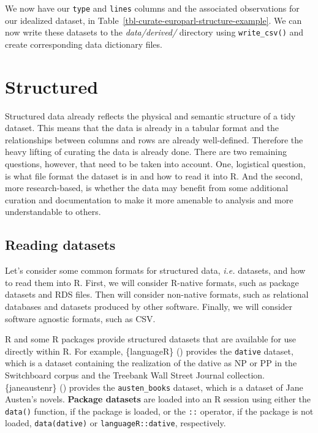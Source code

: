 \documentclass[
  letterpaper,
]{book}
\theoremstyle{definition}
\theoremstyle{remark}
\begin{document}
We now have our \texttt{type} and \texttt{lines} columns and the
associated observations for our idealized dataset, in
Table~\ref{tbl-curate-europarl-structure-example}. We can now write
these datasets to the \emph{data/derived/} directory using
\texttt{write\_csv()} and create corresponding data dictionary files.

\section{Structured}\label{structured}

Structured data already reflects the physical and semantic structure of
a tidy dataset. This means that the data is already in a tabular format
and the relationships between columns and rows are already well-defined.
Therefore the heavy lifting of curating the data is already done. There
are two remaining questions, however, that need to be taken into
account. One, logistical question, is what file format the dataset is in
and how to read it into R. And the second, more research-based, is
whether the data may benefit from some additional curation and
documentation to make it more amenable to analysis and more
understandable to others.

\subsection{Reading datasets}\label{reading-datasets}

Let's consider some common formats for structured data, \emph{i.e.}
datasets, and how to read them into R. First, we will consider R-native
formats, such as package datasets and RDS files. Then will consider
non-native formats, such as relational databases and datasets produced
by other software. Finally, we will consider software agnostic formats,
such as CSV.

R and some R packages provide structured datasets that are available for
use directly within R. For example, \{languageR\}
()
provides the \texttt{dative} dataset, which is a dataset containing the
realization of the dative as NP or PP in the Switchboard corpus and the
Treebank Wall Street Journal collection. \{janeaustenr\}
() provides the
\texttt{austen\_books} dataset, which is a dataset of Jane Austen's
novels. \textbf{Package datasets} are loaded into an R session using
either the \texttt{data()} function, if the package is loaded, or the
\texttt{::} operator, if the package is not loaded,
\texttt{data(dative)} or \texttt{languageR::dative}, respectively.
\end{document}
